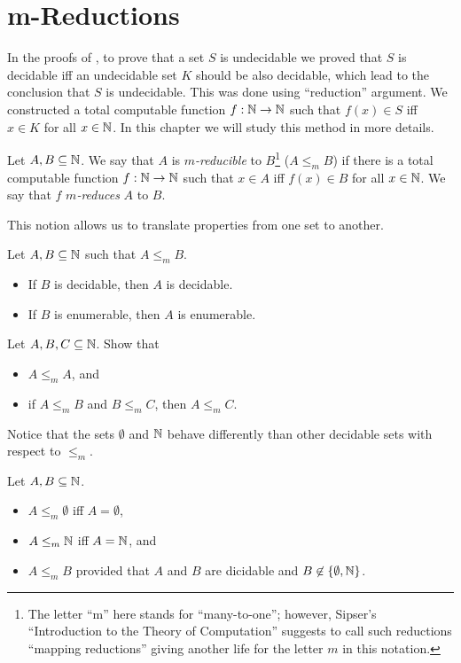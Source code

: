 \chapter{m-Reductions}
In the proofs of , to prove
that a set $S$ is undecidable we proved that $S$ is decidable iff an undecidable
set $K$ should be also decidable, which lead to the conclusion that $S$ is
undecidable. This was done using ``reduction'' argument. We constructed a total
computable function $f : {\mathbb{N}} \to {\mathbb{N}}$ such that $f(x) \in S$ iff $x \in K$ for all
$x \in {\mathbb{N}}$. In
this chapter we will study this method in more details.

\begin{definition}
  Let $A, B \subseteq {\mathbb{N}}$. We say that $A$ is \emph{$m$-reducible} to
  $B$\footnote{%
    The letter ``m'' here stands for ``many-to-one''; however, Sipser's
    ``Introduction to the Theory of Computation'' suggests to call such
    reductions ``mapping reductions'' giving another life for the letter $m$ in
    this notation.
  }
  ($A \le_m B$) if there is a total computable function $f : {\mathbb{N}} \to {\mathbb{N}}$ such
  that $x \in A$ iff $f(x) \in B$ for all $x \in {\mathbb{N}}$. We say that $f$
  \emph{$m$-reduces} $A$ to $B$.
\end{definition}

This notion allows us to translate properties from one set to another.
\begin{theorem}
\label{theorem:m-reduction-complexity-preservation}
  Let $A, B \subseteq {\mathbb{N}}$ such that $A \le_m B$.
  \begin{itemize}
    \item If $B$ is decidable, then $A$ is decidable.
    \item If $B$ is enumerable, then $A$ is enumerable.
  \end{itemize}
\end{theorem}

\begin{exercise}
  Let $A, B, C \subseteq {\mathbb{N}}$. Show that
  \begin{itemize}
    \item $A \le_m A$, and 
    \item if $A \le_m B$ and $B \le_m C$, then $A \le_m C$.
  \end{itemize}
\end{exercise}

Notice that the sets $\emptyset$ and ${\mathbb{N}}$ behave differently than other
decidable sets with respect to $\le_m$.
\begin{remark}
  Let $A, B \subseteq {\mathbb{N}}$.
  \begin{itemize}
    \item $A \le_m \emptyset$ iff $A = \emptyset$, 
    \item $A \le_m {\mathbb{N}}$ iff $A = {\mathbb{N}}$, and
    \item $A \le_m B$ provided that $A$ and $B$ are dicidable and $B \not\in
      \set{\emptyset, \N}$.
  \end{itemize}
\end{remark}

